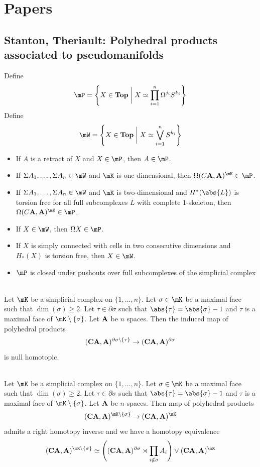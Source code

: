 \documentclass[a4paper]{article}
\begin{document}
\pagebreak
\section{Papers}
\subsection{Stanton, Theriault: Polyhedral products associated to pseudomanifolds}
Define $$\mP=\left\{X\in\bold{Top}\;\bigg{|}\;X\simeq\prod_{i=1}^n\Omega^{j_i}S^{k_i}\right\}$$ Define $$\mW=\left\{X\in\bold{Top}\;\bigg{|}\;X\simeq\bigvee_{i=1}^nS^{k_i}\right\}$$

\begin{itemize}
\item If $A$ is a retract of $X$ and $X\in\mP$, then $A\in\mP$. 
\item If $\Sigma A_1,\dots,\Sigma A_n\in\mW$ and $\mK$ is one-dimensional, then $\Omega(C\bold{A},\bold{A})^\mK\in\mP$. 
\item If $\Sigma A_1,\dots,\Sigma A_n\in\mW$ and $\mK$ is two-dimensional and $H^\ast(\abs{L})$ is torsion free for all full subcomplexes $L$ with complete $1$-skeleton, then $\Omega(C\bold{A},\bold{A})^\mK\in\mP$. 
\item If $X\in\mW$, then $\Omega X\in\mP$. 
\item If $X$ is simply connected with cells in two consecutive dimensions and $H_\ast(X)$ is torsion free, then $X\in\mW$. 
\item $\mP$ is closed under pushouts over full subcomplexes of the simplicial complex
\end{itemize}

\begin{thm}{}{}\\
Let $\mK$ be a simplicial complex on $\{1,\dots,n\}$. Let $\sigma\in\mK$ be a maximal face such that $\dim(\sigma)\geq 2$. Let $\tau\in\partial\sigma$ such that $\abs{\tau}=\abs{\sigma}-1$ and $\tau$ is a maximal face of $\mK\setminus\{\sigma\}$. Let $\bold{A}$ be $n$ spaces. Then the induced map of polyhedral products $$(\bold{CA},\bold{A})^{\partial\sigma\setminus\{\tau\}}\to(\bold{CA},\bold{A})^{\partial\sigma}$$ is null homotopic. 
\end{thm}

\begin{thm}{}{}\\
Let $\mK$ be a simplicial complex on $\{1,\dots,n\}$. Let $\sigma\in\mK$ be a maximal face such that $\dim(\sigma)\geq 2$. Let $\tau\in\partial\sigma$ such that $\abs{\tau}=\abs{\sigma}-1$ and $\tau$ is a maximal face of $\mK\setminus\{\sigma\}$. Let $\bold{A}$ be $n$ spaces. Then map of polyhedral products $$(\bold{CA},\bold{A})^{\mK\setminus\{\sigma\}}\to(\bold{CA},\bold{A})^\mK$$ admits a right homotopy inverse and we have a homotopy equivalence $$(\bold{CA},\bold{A})^{\mK\setminus\{\sigma\}}\simeq\left((\bold{CA},\bold{A})^{\partial\sigma}\rtimes\prod_{i\notin\sigma}A_i\right)\vee(\bold{CA},\bold{A})^\mK$$
\end{thm}
\end{document}
